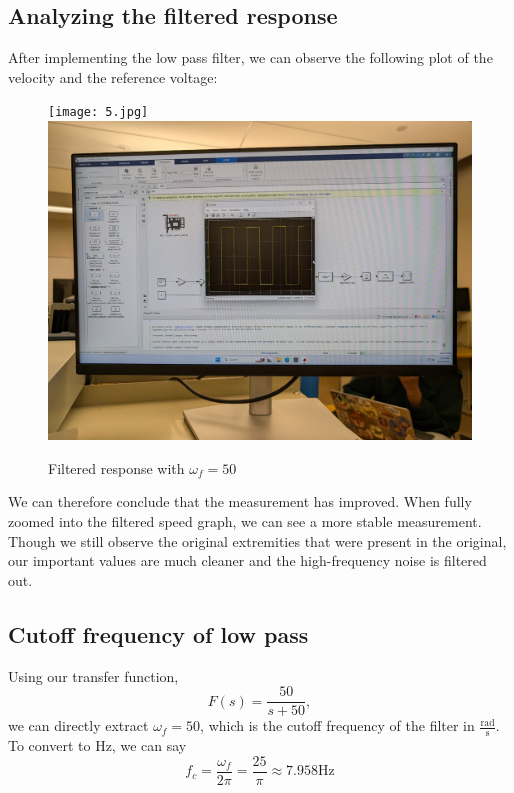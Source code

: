 \documentclass{article}
\begin{document}
\subsection{Analyzing the filtered response}
After implementing the low pass filter, we can observe the following plot of the velocity and the reference voltage:
\begin{figure}[H]
    \centering
    \texttt{[image: 5.jpg]}
    \includegraphics[width=0.49\linewidth]{4.jpg}

    \centering
    \caption{Filtered response with $\omega_f=50$}
    \label{fig:3}
\end{figure}
We can therefore conclude that the measurement has improved. When fully zoomed into the filtered speed graph, we can see a more stable measurement. Though we still observe the original extremities that were present in the original, our important values are much cleaner and the high-frequency noise is filtered out.

\subsection{Cutoff frequency of low pass}
Using our transfer function,
\begin{equation}
    F(s)=\frac{50}{s+50},
\end{equation}
we can directly extract $\omega_f=50$, which is the cutoff frequency of the filter in $\frac{\text{rad}}{\text{s}}$. To convert to $\text{Hz}$, we can say 
\begin{equation}
    f_c=\frac{\omega_f}{2\pi}=\frac{25}{\pi} \approx 7.958\text{Hz}
\end{equation}
\end{document}
